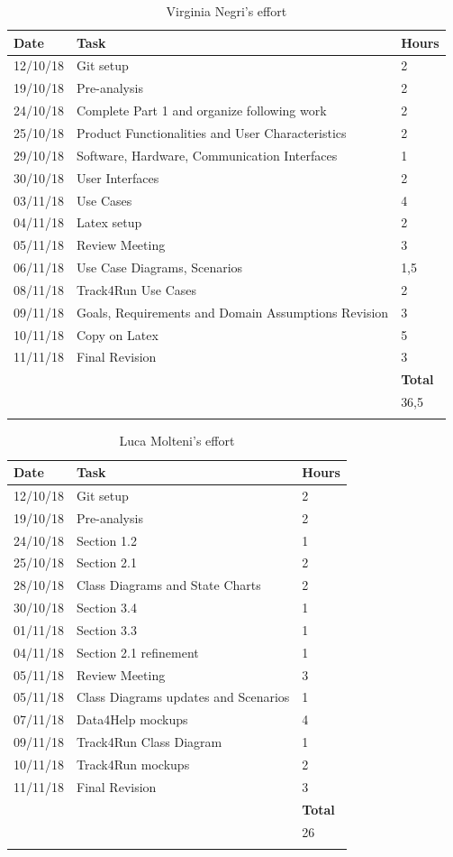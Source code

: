 \documentclass[titlepage]{article}
\begin{document}
		
	\begin{longtable}{| p{2 cm} | p{5 cm} | p{2 cm} |} 
			\hline
			{\bf Date} & {\bf Task} & {\bf Hours}\\
			\hline
			12/10/18 & Git setup & 2 \\
			19/10/18 & Pre-analysis & 2 \\
			24/10/18 & Complete Part 1 and organize following work & 2 \\
			25/10/18 & Product Functionalities and User Characteristics& 2 \\
			29/10/18 & Software, Hardware, Communication Interfaces & 1 \\
			30/10/18 & User Interfaces & 2 \\
			03/11/18 & Use Cases & 4 \\
			04/11/18 & Latex setup & 2 \\
			05/11/18 & Review Meeting & 3 \\
			06/11/18 & Use Case Diagrams, Scenarios & 1,5\\
			08/11/18 & Track4Run Use Cases & 2 \\
			09/11/18 & Goals, Requirements and Domain Assumptions Revision & 3 \\
			10/11/18 & Copy on Latex & 5 \\
			11/11/18 & Final Revision & 3 \\
			\hline
			& & {\bf Total} \\
			\hline
			& & 36,5 \\
			\hline
			\caption{Virginia Negri's effort}
		\end{longtable}
	
		\begin{longtable}{| p{2 cm} | p{5 cm} | p{2 cm} |} 
		\hline
		{\bf Date} & {\bf Task} & {\bf Hours}\\
		\hline
		12/10/18 & Git setup & 2 \\
		19/10/18 & Pre-analysis & 2 \\
		24/10/18 & Section 1.2 & 1 \\
		25/10/18 & Section 2.1 & 2 \\
		28/10/18 & Class Diagrams and State Charts & 2 \\
		30/10/18 & Section 3.4 & 1 \\
		01/11/18 & Section 3.3 & 1 \\
		04/11/18 & Section 2.1 refinement & 1 \\
		05/11/18 & Review Meeting & 3 \\
		05/11/18 & Class Diagrams updates and Scenarios & 1\\
		07/11/18 & Data4Help mockups & 4 \\
		09/11/18 & Track4Run Class Diagram & 1 \\
		10/11/18 & Track4Run mockups & 2 \\
		11/11/18 & Final Revision & 3 \\
		\hline
		& & {\bf Total} \\
		\hline
		& & 26 \\
		\hline
		\caption{Luca Molteni's effort}
	\end{longtable}
	
\end{document}
